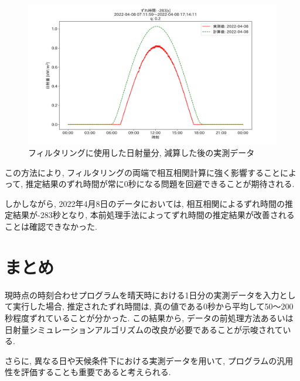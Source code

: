 \documentclass[a4j,12pt,]{jarticle}
\begin{document}
\begin{figure}[H]
  \begin{center}
    \includegraphics[width=160mm]{2022-04-08_mask_by_q_corr.png}
    \caption{フィルタリングに使用した日射量分, 減算した後の実測データ}
    \label{p10}
  \end{center}
\end{figure}

この方法により, フィルタリングの両端で相互相関計算に強く影響することによって, 推定結果のずれ時間が常に0秒になる問題を回避できることが期待される. 

しかしながら, 2022年4月8日のデータにおいては, 相互相関によるずれ時間の推定結果が-283秒となり, 本前処理手法によってずれ時間の推定結果が改善されることは確認できなかった. 

\section{まとめ}
現時点の時刻合わせプログラムを晴天時における1日分の実測データを入力として実行した場合, 推定されたずれ時間は, 真の値である0秒から平均して50〜200秒程度ずれていることが分かった. この結果から, データの前処理方法あるいは日射量シミュレーションアルゴリズムの改良が必要であることが示唆されている. 

さらに, 異なる日や天候条件下における実測データを用いて, プログラムの汎用性を評価することも重要であると考えられる. 
\end{document}
